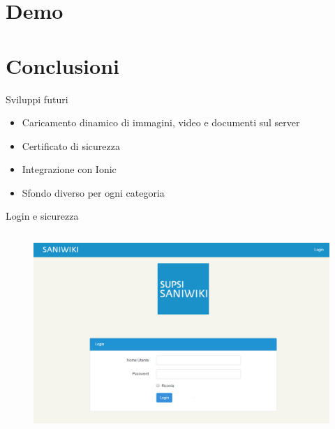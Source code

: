 \documentclass{beamer}
\begin{document}
\section{Demo}


\section{Conclusioni}
\begin{frame}{Sviluppi futuri}
\begin{itemize}
	\item Caricamento dinamico di immagini, video e documenti sul server
	\item Certificato di sicurezza
	\item Integrazione con Ionic
	\item Sfondo diverso per ogni categoria
\end{itemize}
\end{frame}

\begin{frame}[plain]

\end{frame}

\begin{frame}[plain]

\end{frame}

\begin{frame}{Login e sicurezza}
\begin{columns}
	\begin{figure}[!h]
		\includegraphics[scale=0.35]{saniwiki_login.png}
	\end{figure}
\end{columns}
\end{frame}
\end{document}
